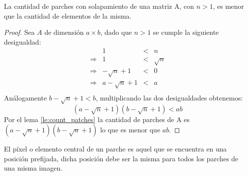 \begin{lemma}\label{le:count_patches_ieq}
	La cantidad de parches con solapamiento de una matriz A, con $n > 1$, es menor que la cantidad de elementos de la misma.
\end{lemma}
\begin{proof}
	Sea $A$ de dimensi\'on $a \times b$, dado que $n > 1$ se cumple la siguiente desigualdad:
	\begin{equation}
		\begin{array}{lrcl}
			                &               1 &<& n        \\ 
			\Longrightarrow &               1 &<& \sqrt{n} \\
			\Longrightarrow &   -\sqrt{n} + 1 &<& 0        \\
			\Longrightarrow & a -\sqrt{n} + 1 &<& a        \\
		\end{array}
	\end{equation}
	An\'alogamente $b -\sqrt{n} + 1 < b$, multiplicando las dos desigualdades obtenemos:
	\begin{equation}
		(a - \sqrt{n} + 1)(b - \sqrt{n} + 1) < ab
		\label{eq:count_patches_ieq}
	\end{equation}
	Por el lema \ref{le:count_patches} la cantidad de parches de A es $(a - \sqrt{n} + 1)(b - \sqrt{n} + 1)$ lo que es menor que $ab$.
\end{proof} 

\begin{definition}
	El p\'ixel o elemento central de un parche es aquel que se encuentra en una posici\'on prefijada, dicha posici\'on debe ser la misma para todos los parches de una misma imagen.
\end{definition}


